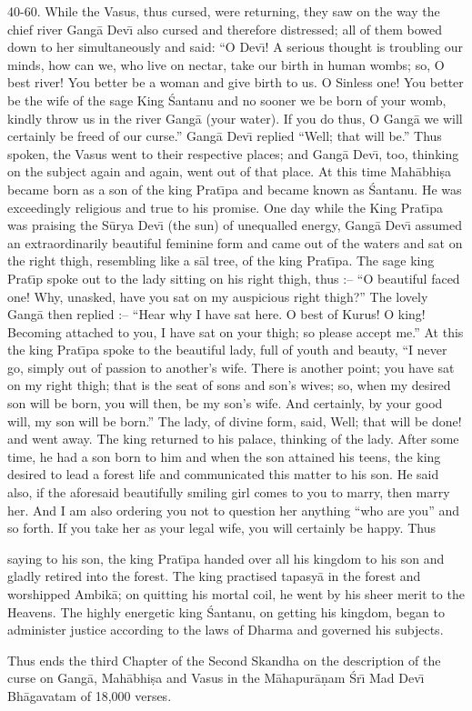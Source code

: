40-60. While the Vasus, thus cursed, were returning, they saw on the way the chief river Gang\=a Dev\={\i} also cursed and therefore distressed; all of them bowed down to her simultaneously and said: ``O Dev\={\i}! A serious thought is troubling our minds, how can we, who live on nectar, take our birth in human wombs; so, O best river! You better be a woman and give birth to us. O Sinless one! You better be the wife of the sage King \'Santanu and no sooner we be born of your womb, kindly throw us in the river Gang\=a (your water). If you do thus, O Gang\=a we will certainly be freed of our curse.'' Gang\=a Dev\={\i} replied ``Well; that will be.'' Thus spoken, the Vasus went to their respective places; and Gang\=a Dev\={\i}, too, thinking on the subject again and again, went out of that place. At this time Mah\=abhi\d{s}a became born as a son of the king Prat\={\i}pa and became known as \'Santanu. He was exceedingly religious and true to his promise. One day while the King Prat\={\i}pa was praising the S\=urya Dev\={\i} (the sun) of unequalled energy, Gang\=a Dev\={\i} assumed an extraordinarily beautiful feminine form and came out of the waters and sat on the right thigh, resembling like a s\=al tree, of the king Prat\={\i}pa. The sage king Prat\={\i}p spoke out to the lady sitting on his right thigh, thus :-- ``O beautiful faced one! Why, unasked, have you sat on my auspicious right thigh?'' The lovely Gang\=a then replied :-- ``Hear why I have sat here. O best of Kurus! O king! Becoming attached to you, I have sat on your thigh; so please accept me.'' At this the king Prat\={\i}pa spoke to the beautiful lady, full of youth and beauty, ``I never go, simply out of passion to another's wife. There is another point; you have sat on my right thigh; that is the seat of sons and son's wives; so, when my desired son will be born, you will then, be my son's wife. And certainly, by your good will, my son will be born.'' The lady, of divine form, said, Well; that will be done! and went away. The king returned to his palace, thinking of the lady. After some time, he had a son born to him and when the son attained his teens, the king desired to lead a forest life and communicated this matter to his son. He said also, if the aforesaid beautifully smiling girl comes to you to marry, then marry her. And I am also ordering you not to question her anything ``who are you'' and so forth. If you take her as your legal wife, you will certainly be happy. Thus

saying to his son, the king Prat\={\i}pa handed over all his kingdom to his son and gladly retired into the forest. The king practised tapasy\=a in the forest and worshipped Ambik\=a; on quitting his mortal coil, he went by his sheer merit to the Heavens. The highly energetic king \'Santanu, on getting his kingdom, began to administer justice according to the laws of Dharma and governed his subjects.

Thus ends the third Chapter of the Second Skandha on the description of the curse on Gang\=a, Mah\=abhi\d{s}a and Vasus in the M\=ahapur\=a\d{n}am \'Sr\={\i} Mad Dev\={\i} Bh\=agavatam of 18,000 verses.




